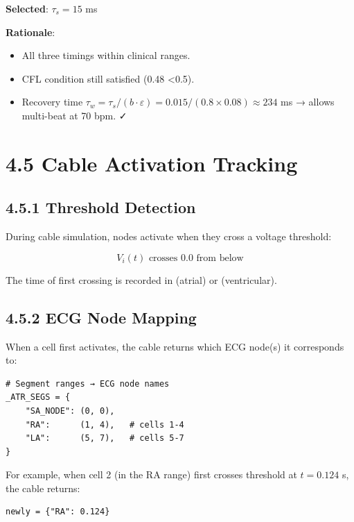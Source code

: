 \textbf{Selected}: $\tau_s = 15$ ms

\textbf{Rationale}:

\begin{itemize}
  \item All three timings within clinical ranges.
  \item CFL condition still satisfied (0.48 \textless 0.5).
  \item Recovery time $\tau_w = \tau_s / (b \cdot \varepsilon) = 0.015 / (0.8 \times 0.08) \approx 234$ ms → allows multi-beat at 70 bpm. ✓
\end{itemize}

\section{4.5 Cable Activation Tracking}

\subsection{4.5.1 Threshold Detection}

During cable simulation, nodes activate when they cross a voltage threshold:

\begin{equation}
V_i(t) \text{ crosses } 0.0 \text{ from below}
\end{equation}

The time of first crossing is recorded in  (atrial) or  (ventricular).

\subsection{4.5.2 ECG Node Mapping}

When a cell first activates, the cable returns which ECG node(s) it corresponds to:

\begin{lstlisting}
# Segment ranges → ECG node names
_ATR_SEGS = {
    "SA_NODE": (0, 0),
    "RA":      (1, 4),   # cells 1-4
    "LA":      (5, 7),   # cells 5-7
}
\end{lstlisting}

For example, when cell 2 (in the RA range) first crosses threshold at $t = 0.124$ s, the cable returns:

\begin{lstlisting}
newly = {"RA": 0.124}
\end{lstlisting}

